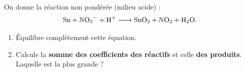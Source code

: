 \documentclass[11pt,a4paper]{article}
\newcounter{exo}
\begin{document}
\begin{exo}
On donne la réaction non pondérée (milieu acide) :
\[
\ce{Sn + NO3^- + H+ -> SnO2 + NO2 + H2O}.
\]
\begin{enumerate}[label=(\alph*),leftmargin=2em,topsep=1pt,itemsep=1pt]
  \item Équilibre complètement cette équation.
  \item Calcule la \textbf{somme des coefficients des réactifs} et celle \textbf{des produits}. Laquelle
        est la plus grande ?
\end{enumerate}
\end{exo}
\end{document}
